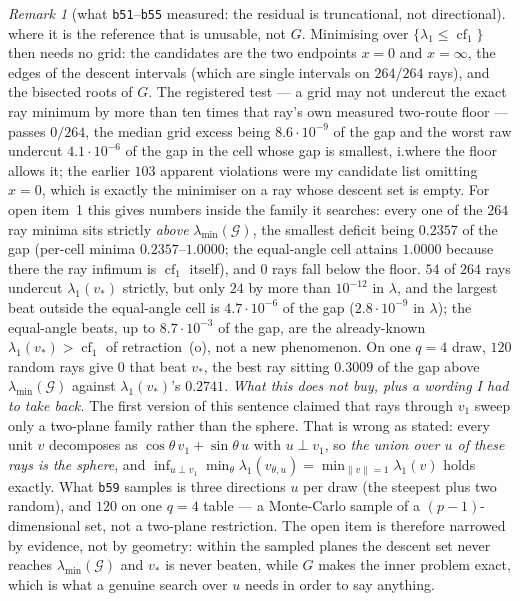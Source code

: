 \documentclass[11pt]{article}
\theoremstyle{remark}
\newtheorem{remark}{Remark}[section]
\newcommand{\Gr}{\mathcal{G}}
\begin{document}
\begin{remark}[what \texttt{b51}--\texttt{b55} measured: the residual is truncational, not directional]
where it is the reference that is unusable, not $G$. Minimising over $\{\lambda_1\le\operatorname{cf}_1\}$
then needs no grid: the candidates are the two endpoints $x=0$ and $x=\infty$, the edges of the descent
intervals (which are single intervals on $264/264$ rays), and the bisected roots of $G$. The registered
test --- a grid may not undercut the exact ray minimum by more than ten times that ray's own measured
two-route floor --- passes $0/264$, the median grid excess being $8.6\cdot10^{-9}$ of the gap and the
worst raw undercut $4.1\cdot10^{-6}$ of the gap in the cell whose gap is smallest, i.\@ where the floor
allows it; the earlier $103$ apparent violations were my candidate list omitting
$x=0$, which is exactly the minimiser on a ray whose descent set is empty.
For open item~1 this gives numbers inside the family it searches: every one of the $264$ ray minima sits
strictly \emph{above} $\lambda_{\min}(\Gr)$, the smallest deficit being $0.2357$ of the gap (per-cell
minima $0.2357$--$1.0000$; the equal-angle cell attains $1.0000$ because there the ray infimum is
$\operatorname{cf}_1$ itself), and $0$ rays fall below the floor. $54$ of $264$ rays undercut
$\lambda_1(v_\ast)$ strictly, but only $24$ by more than $10^{-12}$ in $\lambda$, and the largest beat
outside the equal-angle cell is $4.7\cdot10^{-6}$ of the gap ($2.8\cdot10^{-9}$ in $\lambda$); the
equal-angle beats, up to $8.7\cdot10^{-3}$ of the gap, are the already-known
$\lambda_1(v_\ast)>\operatorname{cf}_1$ of retraction~(o), not a new phenomenon. On one $q=4$ draw,
$120$ random rays give $0$ that beat $v_\ast$, the best ray sitting $0.3009$ of the gap above
$\lambda_{\min}(\Gr)$ against $\lambda_1(v_\ast)$'s $0.2741$.
\emph{What this does not buy, plus a wording I had to take back.} The first version of this sentence
claimed that rays through $v_1$ sweep only a two-plane family rather than the sphere. That is wrong as
stated: every unit $v$ decomposes as $\cos\theta\,v_1+\sin\theta\,u$ with $u\perp v_1$, so \emph{the union
over $u$ of these rays is the sphere}, and
$\inf_{u\perp v_1}\min_\theta\lambda_1(v_{\theta,u})=\min_{\|v\|=1}\lambda_1(v)$ holds exactly. What
\texttt{b59} samples is three directions $u$ per draw (the steepest plus two random), and $120$ on one
$q=4$ table --- a Monte-Carlo sample of a $(p{-}1)$-dimensional set, not a two-plane restriction. The
open item is therefore narrowed by evidence, not by geometry: within the sampled planes the descent set
never reaches $\lambda_{\min}(\Gr)$ and $v_\ast$ is never beaten, while $G$ makes the inner problem exact,
which is what a genuine search over $u$ needs in order to say anything.

\end{remark}
\end{document}
